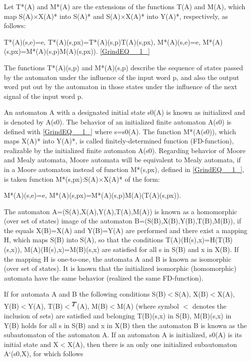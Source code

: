 \documentclass{article}
\begin{document}
Let T*(A) and M*(A) are the extensions of the functions T(A) and M(A), which map S(A)$\times$X(A)* into S(A)* and S(A)$\times$X(A)* into Y(A)*, respectively, as follows:

T*(A)(s,e)=e, T*(A)(s,px)=T*(A)(s,p)T(A)(s,px), M*(A)(s,e)=e, M*(A)(s,px)=M*(A)(s,p)M(A)(s,px)). \eqref{GrindEQ__1_}

The functions T*(A)(s,p) and M*(A)(s,p) describe the sequence of states passed by the automaton under the influence of the input word p, and also the output word put out by the automaton in those states under the influence of the next signal of the input word p.

An automaton A with a designated initial state s0(A) is known as initialized and is denoted by A(s0). The behavior of an initialized finite automaton A(s0) is defined with \eqref{GrindEQ__1_} where s=s0(A).  The function M*(A(s0)), which maps X(A)* into Y(A)*, is called finitely-determined function (FD-function), realizable by the initialized finite automaton A(s0). Regarding behavior of Moore and Mealy automata, Moore automata will be equivalent to Mealy automata, if in a Moore automaton instead of function M*(s,px), defined in \eqref{GrindEQ__1_}, is taken function M*(s,px):S(A)$\times$X(A)* of the form:

M*(A)(s,e)=e, M*(A)(s,px)=M*(A)(s,p)M(A)(T(A)(s,px)).

The automaton A=(S(A),X(A),Y(A),T(A),M(A)) is known as a homomorphic (over set of states) image of the automaton B=(S(B),X(B),Y(B),T(B),M(B)), if the equals X(B)=X(A) and Y(B)=Y(A) are performed and there exist a mapping H, which maps S(B) into S(A), so that the conditions  T(A)(H(s),x)=H(T(B)(s,x)),  M(A)(H(s),x)=M(B)(s,x) are satisfied for all s in S(B) and x in X(B). If the mapping H is one-to-one, the automata A and B is known as isomorphic (over set of states). It is known that the initialized isomorphic (homomorphic) automata have the same behavior (realized the same FD-function).

If for automata A and B the following conditions S(B)$<$S(A), X(B)$<$X(A), Y(B)$<$Y(A),  T(B)$<$\includegraphics[bb=0mm 0mm 208mm 296mm, width=2.9mm, height=5.4mm, viewport=3mm 4mm 205mm 292mm]{image2}(A), M(B)$<$M(A) (where symbol $<$ denotes the inclusion of sets) are satisfied and belonging T(B)(s,x) in S(B), M(B)(s,x) in Y(B) holds for all s in S(B) and x in X(B) then the automaton B is known as the subautomaton of the automaton A. If an automaton A is initialized, s0(A) is its initial state and X$<$X(A), then there is an only one initialized  subautomaton A`(s0,X), for which follows
\end{document}

